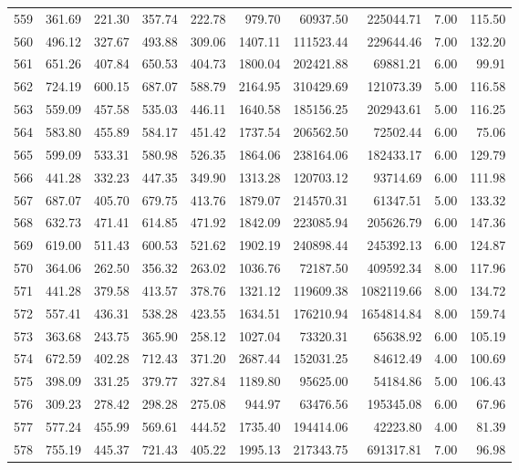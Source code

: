 \begin{tabular}{lrrrrrrrrr}
559 & 361.69 & 221.30 & 357.74 & 222.78 & 979.70 & 60937.50 & 225044.71 & 7.00 & 115.50 \\
560 & 496.12 & 327.67 & 493.88 & 309.06 & 1407.11 & 111523.44 & 229644.46 & 7.00 & 132.20 \\
561 & 651.26 & 407.84 & 650.53 & 404.73 & 1800.04 & 202421.88 & 69881.21 & 6.00 & 99.91 \\
562 & 724.19 & 600.15 & 687.07 & 588.79 & 2164.95 & 310429.69 & 121073.39 & 5.00 & 116.58 \\
563 & 559.09 & 457.58 & 535.03 & 446.11 & 1640.58 & 185156.25 & 202943.61 & 5.00 & 116.25 \\
564 & 583.80 & 455.89 & 584.17 & 451.42 & 1737.54 & 206562.50 & 72502.44 & 6.00 & 75.06 \\
565 & 599.09 & 533.31 & 580.98 & 526.35 & 1864.06 & 238164.06 & 182433.17 & 6.00 & 129.79 \\
566 & 441.28 & 332.23 & 447.35 & 349.90 & 1313.28 & 120703.12 & 93714.69 & 6.00 & 111.98 \\
567 & 687.07 & 405.70 & 679.75 & 413.76 & 1879.07 & 214570.31 & 61347.51 & 5.00 & 133.32 \\
568 & 632.73 & 471.41 & 614.85 & 471.92 & 1842.09 & 223085.94 & 205626.79 & 6.00 & 147.36 \\
569 & 619.00 & 511.43 & 600.53 & 521.62 & 1902.19 & 240898.44 & 245392.13 & 6.00 & 124.87 \\
570 & 364.06 & 262.50 & 356.32 & 263.02 & 1036.76 & 72187.50 & 409592.34 & 8.00 & 117.96 \\
571 & 441.28 & 379.58 & 413.57 & 378.76 & 1321.12 & 119609.38 & 1082119.66 & 8.00 & 134.72 \\
572 & 557.41 & 436.31 & 538.28 & 423.55 & 1634.51 & 176210.94 & 1654814.84 & 8.00 & 159.74 \\
573 & 363.68 & 243.75 & 365.90 & 258.12 & 1027.04 & 73320.31 & 65638.92 & 6.00 & 105.19 \\
574 & 672.59 & 402.28 & 712.43 & 371.20 & 2687.44 & 152031.25 & 84612.49 & 4.00 & 100.69 \\
575 & 398.09 & 331.25 & 379.77 & 327.84 & 1189.80 & 95625.00 & 54184.86 & 5.00 & 106.43 \\
576 & 309.23 & 278.42 & 298.28 & 275.08 & 944.97 & 63476.56 & 195345.08 & 6.00 & 67.96 \\
577 & 577.24 & 455.99 & 569.61 & 444.52 & 1735.40 & 194414.06 & 42223.80 & 4.00 & 81.39 \\
578 & 755.19 & 445.37 & 721.43 & 405.22 & 1995.13 & 217343.75 & 691317.81 & 7.00 & 96.98 \\

\end{tabular}
